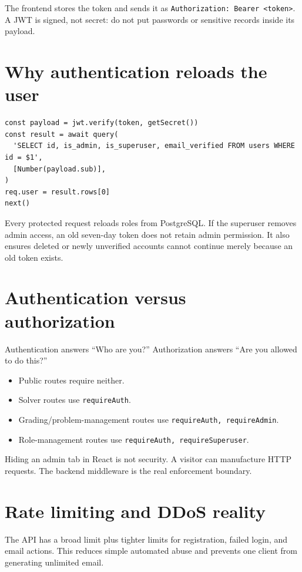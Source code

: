 \documentclass[11pt,oneside]{book}
\newcommand{\code}[1]{\texttt{#1}}
\begin{document}
The frontend stores the token and sends it as \code{Authorization: Bearer <token>}. A JWT is signed, not secret: do not put passwords or sensitive records inside its payload.

\section{Why authentication reloads the user}
\begin{lstlisting}[title={server/auth.js, simplified}]
const payload = jwt.verify(token, getSecret())
const result = await query(
  'SELECT id, is_admin, is_superuser, email_verified FROM users WHERE id = $1',
  [Number(payload.sub)],
)
req.user = result.rows[0]
next()
\end{lstlisting}

Every protected request reloads roles from PostgreSQL. If the superuser removes admin access, an old seven-day token does not retain admin permission. It also ensures deleted or newly unverified accounts cannot continue merely because an old token exists.

\section{Authentication versus authorization}
Authentication answers ``Who are you?'' Authorization answers ``Are you allowed to do this?''

\begin{itemize}
  \item Public routes require neither.
  \item Solver routes use \code{requireAuth}.
  \item Grading/problem-management routes use \code{requireAuth, requireAdmin}.
  \item Role-management routes use \code{requireAuth, requireSuperuser}.
\end{itemize}

Hiding an admin tab in React is not security. A visitor can manufacture HTTP requests. The backend middleware is the real enforcement boundary.

\section{Rate limiting and DDoS reality}
The API has a broad limit plus tighter limits for registration, failed login, and email actions. This reduces simple automated abuse and prevents one client from generating unlimited email.
\end{document}
